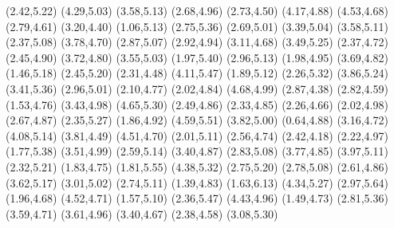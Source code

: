 \psdot[](2.42,5.22)
\psdot[](4.29,5.03)
\psdot[](3.58,5.13)
\psdot[](2.68,4.96)
\psdot[](2.73,4.50)
\psdot[](4.17,4.88)
\psdot[](4.53,4.68)
\psdot[](2.79,4.61)
\psdot[](3.20,4.40)
\psdot[](1.06,5.13)
\psdot[](2.75,5.36)
\psdot[](2.69,5.01)
\psdot[](3.39,5.04)
\psdot[](3.58,5.11)
\psdot[](2.37,5.08)
\psdot[](3.78,4.70)
\psdot[](2.87,5.07)
\psdot[](2.92,4.94)
\psdot[](3.11,4.68)
\psdot[](3.49,5.25)
\psdot[](2.37,4.72)
\psdot[](2.45,4.90)
\psdot[](3.72,4.80)
\psdot[](3.55,5.03)
\psdot[](1.97,5.40)
\psdot[](2.96,5.13)
\psdot[](1.98,4.95)
\psdot[](3.69,4.82)
\psdot[](1.46,5.18)
\psdot[](2.45,5.20)
\psdot[](2.31,4.48)
\psdot[](4.11,5.47)
\psdot[](1.89,5.12)
\psdot[](2.26,5.32)
\psdot[](3.86,5.24)
\psdot[](3.41,5.36)
\psdot[](2.96,5.01)
\psdot[](2.10,4.77)
\psdot[](2.02,4.84)
\psdot[](4.68,4.99)
\psdot[](2.87,4.38)
\psdot[](2.82,4.59)
\psdot[](1.53,4.76)
\psdot[](3.43,4.98)
\psdot[](4.65,5.30)
\psdot[](2.49,4.86)
\psdot[](2.33,4.85)
\psdot[](2.26,4.66)
\psdot[](2.02,4.98)
\psdot[](2.67,4.87)
\psdot[](2.35,5.27)
\psdot[](1.86,4.92)
\psdot[](4.59,5.51)
\psdot[](3.82,5.00)
\psdot[](0.64,4.88)
\psdot[](3.16,4.72)
\psdot[](4.08,5.14)
\psdot[](3.81,4.49)
\psdot[](4.51,4.70)
\psdot[](2.01,5.11)
\psdot[](2.56,4.74)
\psdot[](2.42,4.18)
\psdot[](2.22,4.97)
\psdot[](1.77,5.38)
\psdot[](3.51,4.99)
\psdot[](2.59,5.14)
\psdot[](3.40,4.87)
\psdot[](2.83,5.08)
\psdot[](3.77,4.85)
\psdot[](3.97,5.11)
\psdot[](2.32,5.21)
\psdot[](1.83,4.75)
\psdot[](1.81,5.55)
\psdot[](4.38,5.32)
\psdot[](2.75,5.20)
\psdot[](2.78,5.08)
\psdot[](2.61,4.86)
\psdot[](3.62,5.17)
\psdot[](3.01,5.02)
\psdot[](2.74,5.11)
\psdot[](1.39,4.83)
\psdot[](1.63,6.13)
\psdot[](4.34,5.27)
\psdot[](2.97,5.64)
\psdot[](1.96,4.68)
\psdot[](4.52,4.71)
\psdot[](1.57,5.10)
\psdot[](2.36,5.47)
\psdot[](4.43,4.96)
\psdot[](1.49,4.73)
\psdot[](2.81,5.36)
\psdot[](3.59,4.71)
\psdot[](3.61,4.96)
\psdot[](3.40,4.67)
\psdot[](2.38,4.58)
\psdot[](3.08,5.30)
